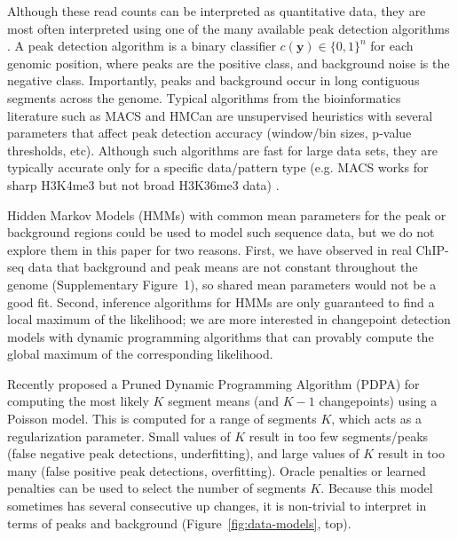 \documentclass[twoside,11pt]{article}
\begin{document}
Although these read counts can be interpreted as quantitative data,
they are most often interpreted using one of the many available peak
detection algorithms \citep{evaluation2010, rye2010manually,
  chip-seq-bench}. A peak detection algorithm is a binary classifier $c(\mathbf y)\in\{0,1\}^n$
for each genomic position, where peaks are the positive class, and
background noise is the negative class. Importantly, peaks and
background occur in long contiguous segments across the
genome. Typical algorithms from the bioinformatics literature such as
MACS \citep{MACS} and HMCan \citep{HMCan} are unsupervised heuristics with several
parameters that affect peak detection accuracy (window/bin sizes,
p-value thresholds, etc). Although such algorithms are fast for large
data sets, they are typically accurate only for a specific data/pattern type (e.g. MACS works for sharp H3K4me3 but not broad H3K36me3 data)
\citep{HOCKING2016-chipseq}.

Hidden Markov Models (HMMs) with common mean parameters for the peak
or background regions could be used to model such sequence data, but
we do not explore them in this paper for two reasons. First, we have
observed in real ChIP-seq data that background and peak means are not
constant throughout the genome (Supplementary Figure~1), so shared
mean parameters would not be a good fit. Second, inference algorithms
for HMMs are only guaranteed to find a local maximum of the
likelihood; we are more interested in changepoint detection models
with dynamic programming algorithms that can provably compute the
global maximum of the corresponding likelihood.

Recently \citet{cleynen2013segmentation} proposed a Pruned Dynamic
Programming Algorithm (PDPA) for computing the most likely $K$ segment
means (and $K-1$ changepoints) using a Poisson model. This is computed for a range
of segments $K$, which acts as a regularization parameter. Small
values of $K$ result in too few segments/peaks (false negative peak detections, underfitting), and
large values of $K$ result in too many (false positive peak detections, overfitting). Oracle penalties
\citep{cleynen2013segmentation} or learned penalties
\citep{HOCKING-penalties} can be used to select the number of segments
$K$.
Because this model sometimes has several consecutive up
changes, it is non-trivial to interpret in terms of peaks and
background (Figure~\ref{fig:data-models}, top).
\end{document}
